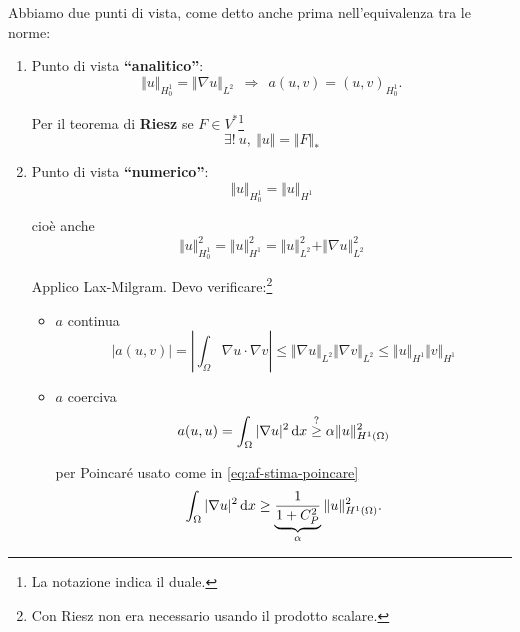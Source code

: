 Abbiamo due punti di vista, come detto anche prima nell'equivalenza tra le norme:
\begin{enumerate}
    \item Punto di vista \textbf{``analitico''}:
          \begin{equation*}
              \boxed{\Vert u\Vert _{H_{0}^{1}} =\Vert \nabla u\Vert _{L^{2}}} \ \ \Rightarrow \ \ a(u,v) =(u,v)_{H_{0}^{1}} .
          \end{equation*}

          Per il teorema di \textbf{Riesz }se $\displaystyle F\in V^{*}$\footnote{La notazione indica il duale.}
          \begin{equation*}
              \exists !\ u,\ \Vert u\Vert =\Vert F\Vert _{*}
          \end{equation*}
    \item Punto di vista \textbf{``numerico''}:
          \begin{equation*}
              \boxed{\Vert u\Vert _{H_{0}^{1}} =\Vert u\Vert _{H^{1}}}
          \end{equation*}

          cioè anche
          \begin{equation*}
              \Vert u\Vert _{H_{0}^{1}}^{2} =\Vert u\Vert _{H^{1}}^{2} =\Vert u\Vert _{L^{2}}^{2} +\Vert \nabla u\Vert _{L^{2}}^{2}
          \end{equation*}

          Applico Lax-Milgram. Devo verificare:\footnote{Con Riesz non era necessario usando il prodotto scalare.}
          \begin{itemize}
              \item $a$ continua
                    \begin{equation*}
                        | a(u,v)| =\left| \int _{\Omega } \nabla u\cdotp \nabla v\right| \leq \Vert \nabla u\Vert _{L^{2}}\Vert \nabla v\Vert _{L^{2}} \leq \Vert u\Vert _{H^{1}}\Vert v\Vert _{H^{1}}
                    \end{equation*}
              \item $a$ coerciva
                    \begin{equation*}
                        a(u,u) =\int _{\Omega }| \nabla u| ^{2} \,\mathrm d x\overset{?}{\geq } \alpha \Vert u\Vert _{H^{1}(\Omega)}^{2}
                    \end{equation*}

                    per Poincaré usato come in \eqref{eq:af-stima-poincare}
                    \begin{equation*}
                        \int _{\Omega }| \nabla u| ^{2} \,\mathrm d x\geq \underbrace{\frac{1}{1+C_{P}^{2}}}_{\alpha}\Vert u\Vert _{H^{1}(\Omega)}^{2} .
                    \end{equation*}
          \end{itemize}
\end{enumerate}

